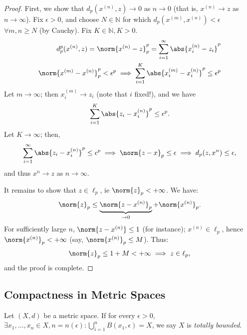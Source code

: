 \begin{proof}
    First, we show that $d_p(x^{(n)}, z) \to 0$ as $n \to 0$ (that is, $x^{(n)} \to z$ as $n \to \infty$). Fix $\epsilon >0$, and choose $N \in \mathbb{N}$ for which $d_p(x^{(m)}, x^{(n)} )< \epsilon$ $\forall m, n \geq N$ (by Cauchy). Fix $K \in \mathbb{N}, K > 0$.
    \begin{align*}
        d_p^p(x^{(n)}, z) = \norm{x^{(n)} - z}_p^p = \sum_{i=1}^\infty \abs{x_i^{(n)} - z_i}^{p}\\
        \norm{x^{(m)} - x^{(n)}}_p^p < \epsilon^p \implies \sum_{i=1}^K\abs{x_i^{(m)} - x_i^{(n)}}^p \leq \epsilon^p
    \end{align*}
    Let $m \to \infty$; then $x_i^{(m)} \to z_i$ (note that $i$ fixed!), and we have \begin{align*}
        \sum_{i=1}^K\abs{z_i - x_i^{(n)}}^p \leq \epsilon^p.
    \end{align*}
    Let $K \to \infty$; then, 
    \begin{align*}
        \sum_{i=1}^\infty \abs{z_i - x_i^{(n)}}^p \leq \epsilon^p\implies \norm{z - x}_p \leq \epsilon\implies d_p(z, x^{n}) \leq \epsilon,
    \end{align*}
    and thus $x^{n} \to z$ as $n \to \infty$. 

    It remains to show that $z \in \ell_p$, ie $\norm{z}_p < + \infty$. We have:
    \begin{align*}
        \norm{z}_p \leq \underbrace{\norm{z - x^{(n)}}_p}_{\to 0} + \norm{x^{(n)}}_p.
    \end{align*}
    For sufficiently large $n$, $\norm{z - x^{(n)}} \leq 1$ (for instance); $x^{(n)} \in \ell_p$, hence $\norm{x^{(n)}}_p < + \infty$ (say, $\norm{x^{(n)}}_p \leq M$). Thus:\begin{align*}
        \norm{z}_p \leq 1 + M < + \infty \implies z \in \ell_p,
    \end{align*}
    and the proof is complete.
\end{proof}

\subsection{Compactness in Metric Spaces}
\begin{definition}
    Let $(X,d)$ be a metric space. If for every $\epsilon > 0$, $\exists x_1, \dots, x_n \in X, n = n(\epsilon) : \bigcup_{i=1}^n B(x_1, \epsilon) = X$, we say $X$ is \emph{totally bounded}.
\end{definition}
